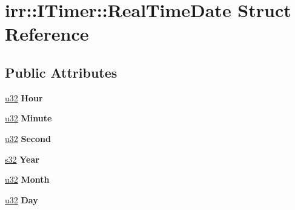 \hypertarget{structirr_1_1ITimer_1_1RealTimeDate}{}\section{irr\+:\+:I\+Timer\+:\+:Real\+Time\+Date Struct Reference}
\label{structirr_1_1ITimer_1_1RealTimeDate}
\subsection*{Public Attributes}
\begin{DoxyCompactItemize}
\item 
\hyperlink{namespaceirr_a0416a53257075833e7002efd0a18e804}{u32} {\bfseries Hour}\hypertarget{structirr_1_1ITimer_1_1RealTimeDate_aa351790a80c772be74a6ff1e31ec02aa}{}\label{structirr_1_1ITimer_1_1RealTimeDate_aa351790a80c772be74a6ff1e31ec02aa}

\item 
\hyperlink{namespaceirr_a0416a53257075833e7002efd0a18e804}{u32} {\bfseries Minute}\hypertarget{structirr_1_1ITimer_1_1RealTimeDate_aa00685f995f29fbaa53c68fa0ab2ddb9}{}\label{structirr_1_1ITimer_1_1RealTimeDate_aa00685f995f29fbaa53c68fa0ab2ddb9}

\item 
\hyperlink{namespaceirr_a0416a53257075833e7002efd0a18e804}{u32} {\bfseries Second}\hypertarget{structirr_1_1ITimer_1_1RealTimeDate_afe3e99433021c0a16a3f10503841de42}{}\label{structirr_1_1ITimer_1_1RealTimeDate_afe3e99433021c0a16a3f10503841de42}

\item 
\hyperlink{namespaceirr_ac66849b7a6ed16e30ebede579f9b47c6}{s32} {\bfseries Year}\hypertarget{structirr_1_1ITimer_1_1RealTimeDate_aa9d53aef51c2b18351aaec8f56af4822}{}\label{structirr_1_1ITimer_1_1RealTimeDate_aa9d53aef51c2b18351aaec8f56af4822}

\item 
\hyperlink{namespaceirr_a0416a53257075833e7002efd0a18e804}{u32} {\bfseries Month}\hypertarget{structirr_1_1ITimer_1_1RealTimeDate_a2d881e471c8fa0a0b6f50762964e48a5}{}\label{structirr_1_1ITimer_1_1RealTimeDate_a2d881e471c8fa0a0b6f50762964e48a5}

\item 
\hyperlink{namespaceirr_a0416a53257075833e7002efd0a18e804}{u32} {\bfseries Day}\hypertarget{structirr_1_1ITimer_1_1RealTimeDate_ae956d5d24c4b617e89f44ca901d502fc}{}\label{structirr_1_1ITimer_1_1RealTimeDate_ae956d5d24c4b617e89f44ca901d502fc}


\end{DoxyCompactItemize}
